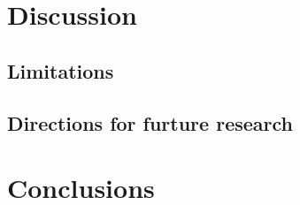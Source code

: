 \documentclass[preprint, 3p,
authoryear]{elsarticle} %
\begin{document}
\section{Discussion}\label{discussion}

\subsection{Limitations}\label{limitations}

\subsection{Directions for furture
research}\label{directions-for-furture-research}

\section{Conclusions}\label{conclusions}

\renewcommand\refname{References}

\end{document}
